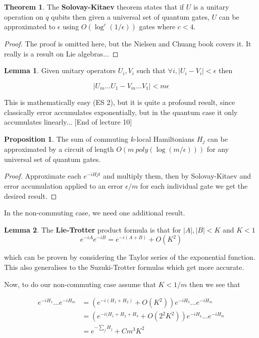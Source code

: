 \documentclass{article}
\theoremstyle{definition}
\newtheorem{theorem}{Theorem}
\newtheorem{lemma}{Lemma}
\newtheorem{proposition}{Proposition}
\begin{document}
\begin{theorem}
  The \textbf{Solovay-Kitaev} theorem states that if $U$ is a unitary operation
  on $q$ qubits then given a universal set of quantum gates, $U$ can be
  approximated to $\epsilon$ using $O(\log^c(1 / \epsilon))$ gates where $c
  < 4$.
\end{theorem}

\begin{proof}
  The proof is omitted here, but the Nielsen and Chuang book covers it. It
  really is a result on Lie algebras...
\end{proof}

\begin{lemma}
  Given unitary operators $U_i, V_i$ such that $\forall i, |U_i - V_i| <
  \epsilon$ then

  $$ |U_m \dots U_1 - V_m \dots V_1| < m \epsilon $$
\end{lemma}

This is mathematically easy (ES 2), but it is quite a profound result, since
classically error accumulates exponentially, but in the quantum case it only
accumulates linearly... [End of lecture 10]

\begin{proposition}
  The sum of commuting $k$-local Hamiltonians $H_j$ can be approximated by a
  circuit of length $O(m \ poly(\log(m / \epsilon)))$ for any universal set of
  quantum gates.
\end{proposition}

\begin{proof}
  Approximate each $e^{-iHj t}$ and multiply them, then by Solovay-Kitaev and
  error accumulation applied to an error $\epsilon / m$ for each individual gate
  we get the desired result.
\end{proof}

In the non-commuting case, we need one additional result.

\begin{lemma}
  The \textbf{Lie-Trotter} product formula is that for $|A|, |B| < K$ and $K <
  1$
  $$ e^{-iA} e^{-iB} = e^{-i(A + B)} + O(K^2) $$
\end{lemma}

which can be proven by considering the Taylor series of the exponential
function. This also generalises to the Suzuki-Trotter formulas which get more
accurate.

Now, to do our non-commuting case assume that $K < 1 / m$ then we see that

\begin{align*}
e^{-iH_1} \dots e^{-iH_m} &= (e^{-i(H_1 + H_2)} + O(K^2)) e^{-iH_3} \dots e^{-iH_m} \\
                          &= (e^{-i(H_1 + H_2 + H_3} + O(2^2 K^2)) e^{-iH_4} \dots e^{-iH_m} \\
  &= e^{-\sum_j H_j} + Cm^3 K^2
\end{align*}
\end{document}
